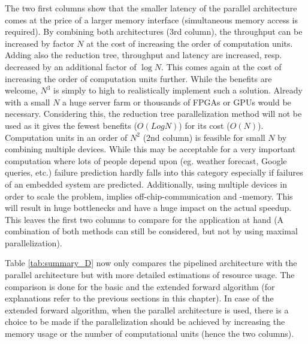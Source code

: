 \documentclass[mscthesis]{usiinfthesis}
\begin{document}
The two first columns show that the smaller latency of the parallel
architecture comes at the price of a larger memory interface (simultaneous
memory access is required). By combining both architectures (3rd column), the
throughput can be increased by factor $N$ at the cost of increasing the order
of computation units. Adding also the reduction tree, throughput and latency
are increased, resp. decreased by an additional factor of $\log N$. This comes
again at the cost of increasing the order of computation units further. While
the benefits are welcome, $N^3$ is simply to high to realistically implement
such a solution.  Already with a small $N$ a huge server farm or thousands of
FPGAs or GPUs would be necessary. Considering this, the reduction tree
parallelization method will not be used as it gives the fewest benefits
($O(LogN)$) for its cost ($O(N)$).  Computation units in an order of $N^2$ (2nd
column) is feasible for small $N$ by combining multiple devices. While this may
be acceptable for a very important computation where lots of people depend upon
(eg. weather forecast, Google queries, etc.) failure prediction hardly falls
into this category especially if failures of an embedded system are predicted.
Additionally, using multiple devices in order to scale the problem, implies
off-chip-communication and -memory. This will result in huge bottlenecks and
have a huge impact on the actual speedup. This leaves the first two columns to
compare for the application at hand (A combination of both methods can still be
considered, but not by using maximal parallelization).

Table \ref{tab:summary_D} now only compares the pipelined architecture with the
parallel architecture but with more detailed estimations of resource usage.
The comparison is done for the basic and the extended forward algorithm (for
explanations refer to the previous sections in this chapter). In case of the
extended forward algorithm, when the parallel architecture is used, there is
a choice to be made if the parallelization should be achieved by increasing the
memory usage or the number of computational units (hence the two columns).
\end{document}
